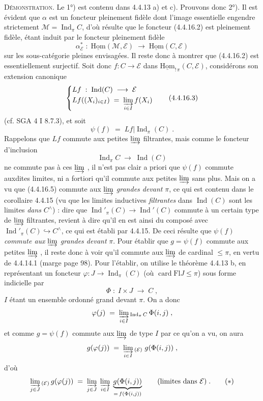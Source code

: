 \documentclass[11pt]{article}
\newcommand{\printedpage}[1]{\marginpar{\footnotesize p.~#1}}
\newcommand{\msp}[1]{\marginpar{\footnotesize [#1]}}
\newcommand{\Ind}{\operatorname{Ind}}
\newcommand{\uHom}{\underline{\mathrm{Hom}}}
\newcommand{\card}{\operatorname{card}}
\newcommand{\Fl}{\mathrm{Fl}}
\begin{document}
\textsc{Démonstration}. Le 1°) est contenu dans 4.4.13 a) et c). Prouvons donc 2°). Il est évident que $\alpha$ est un foncteur pleinement fidèle dont l'image essentielle engendre strictement
\printedpage{27}
$\mathcal{M}=\Ind_\pi C$, d'où résulte que le foncteur (4.4.16.2) est pleinement fidèle, étant induit par le foncteur pleinement fidèle
\[
\alpha^*_{\mathcal{E}}\;:\;\uHom(\mathcal{M},\mathcal{E})\;\longrightarrow\;\uHom(C,\mathcal{E})
\]
\msp{page 103}
sur les sous-catégorie pleines envisagées. Il reste donc à montrer que (4.4.16.2) est essentiellement surjectif. Soit donc $f:C\longrightarrow\mathcal{E}$ dans $\uHom_{!\,\pi}(C,\mathcal{E})$, considérons son extension canonique %
\[
\left\{
\begin{aligned}
&Lf\;:\;\Ind(C)\;\longrightarrow\;\mathcal{E}\\
&Lf((X_i)_{i\in I})\;=\;\varinjlim_{i\in I}f(X_i)
\end{aligned}
\right.
\tag*{(4.4.16.3)}
\]
(cf. SGA 4 I 8.7.3), et soit
\[
\psi(f)\;=\;Lf|\Ind_\pi(C)\;. \tag*{(4.4.16.4)}
\]
Rappelons que $Lf$ commute aux petites $\varinjlim$ filtrantes, mais comme le foncteur d'inclusion
\[
\Ind_\pi C\;\longrightarrow\;\Ind(C) \tag*{(4.4.16.5)}
\]
ne commute pas à ces $\varinjlim$ , il n'est pas clair a priori que $\psi(f)$ commute auxdites limites, ni a fortiori qu'il commute aux petites $\varinjlim$ sans plus. Mais on a vu que (4.4.16.5) commute aux $\varinjlim$ \textit{grandes devant} $\pi$, ce qui est contenu dans le corollaire 4.4.15 (vu que les limites inductives \textit{filtrantes} dans $\Ind(C)$ sont les limites \textit{dans} $C^\wedge$) : dire que $\Ind'_\pi(C)\longrightarrow\Ind'(C)$ commute à un certain type de $\varinjlim$ filtrantes, revient à dire qu'il en est ainsi du composé avec $\Ind'_\pi(C)\hookrightarrow C^\wedge$, ce qui est établi par 4.4.15. De ceci résulte que $\psi(f)$ \textit{commute aux} $\varinjlim$ \textit{grandes devant} $\pi$. Pour établir que $g=\psi(f)$ commute
\msp{page 104}
aux petites $\varinjlim$ , il reste donc à voir qu'il commute aux $\varinjlim$ de cardinal $\leqslant\pi$, en vertu de 4.4.14.1 (marge page 98). Pour l'établir, on utilise le théorème 4.4.13 b, en représentant un foncteur $\varphi:J\longrightarrow\Ind_\pi(C)$ (où $\card\Fl J\leqslant\pi$) sous forme indicielle par
\[
\Phi\;:\;I\times J\;\longrightarrow\;C\;, \tag*{(4.4.16.6)}
\]
$I$ étant un ensemble ordonné grand devant $\pi$. On a donc
\[
\varphi(j)\;=\;\varinjlim_{i\in I}{}_{\Ind_\pi C}\,\Phi(i,j)\;,
\]
et comme $g=\psi(f)$ commute aux $\varinjlim$ de type $I$ par ce qu'on a vu, on aura
\[
g(\varphi(j))\;=\;\varinjlim_{i\in I}{}_{(\mathcal{E})}\;g(\Phi(i,j))\;,
\]
d'où
\[
\varinjlim_{j\in J}{}_{(\mathcal{E})}\,g(\varphi(j))\;=\;\varinjlim_{j\in J}\;\varinjlim_{i\in I}\;\underbrace{g(\Phi(i,j))}_{=\,f(\Phi(i,j))}\qquad\text{(limites dans $\mathcal{E}$)}\;. \tag*{$(*)$}
\]
\printedpage{28}
\end{document}
